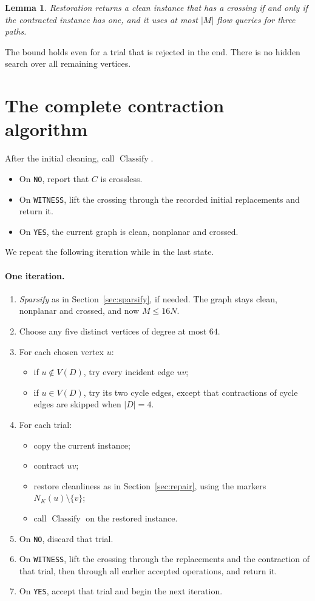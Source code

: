 \documentclass[11pt]{article}
\newtheorem{lemma}{Lemma}
\DeclareMathOperator{\Classify}{Classify}
\newcommand{\ans}[1]{\texttt{#1}}
\begin{document}
\begin{lemma}\label{lem:restore}
Restoration returns a clean instance that has a crossing if and only if the
contracted instance has one, and it uses at most $|M|$ flow queries for three
paths.
\end{lemma}

The bound holds even for a trial that is rejected in the end. There is no
hidden search over all remaining vertices.

\section{The complete contraction algorithm}\label{sec:loop}

After the initial cleaning, call $\Classify$.
\begin{itemize}[nosep]
\item On \ans{NO}, report that $C$ is crossless.
\item On \ans{WITNESS}, lift the crossing through the recorded initial
replacements and return it.
\item On \ans{YES}, the current graph is clean, nonplanar and crossed.
\end{itemize}

We repeat the following iteration while in the last state.

\paragraph{One iteration.}
\begin{enumerate}[nosep]
\item \emph{Sparsify} as in Section~\ref{sec:sparsify}, if needed. The graph
stays clean, nonplanar and crossed, and now $M\le16N$.
\item Choose any five distinct vertices of degree at most $64$.
\item For each chosen vertex $u$:
\begin{itemize}[nosep]
\item if $u\notin V(D)$, try every incident edge $uv$;
\item if $u\in V(D)$, try its two cycle edges, except that contractions of
cycle edges are skipped when $|D|=4$.
\end{itemize}
\item For each trial:
\begin{itemize}[nosep]
\item copy the current instance;
\item contract $uv$;
\item restore cleanliness as in Section~\ref{sec:repair}, using the markers
$N_K(u)\setminus\{v\}$;
\item call $\Classify$ on the restored instance.
\end{itemize}
\item On \ans{NO}, discard that trial.
\item On \ans{WITNESS}, lift the crossing through the replacements and the
contraction of that trial, then through all earlier accepted operations, and
return it.
\item On \ans{YES}, accept that trial and begin the next iteration.
\end{enumerate}
\end{document}

